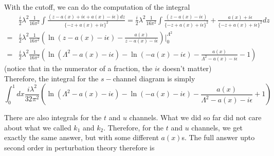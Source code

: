 \documentclass[11pt, notitlepage]{report}
\numberwithin{equation}{section}
\begin{document}
With the cutoff, we can do the computation of the integral 
\begin{align*}
    &\frac{i}{2}\lambda^2  \frac{1}{16\pi^2}\int  \frac{(z -a(x) + i\epsilon +a(x)-i\epsilon) dz}{\{-z + a(x) + i\epsilon\}^2} = \frac{i}{2}\lambda^2  \frac{1}{16\pi^2}\int  \frac{(z -a(x)-i\epsilon)}{\{-z + a(x) + i\epsilon\}^2} + \frac{a(x) +i\epsilon}{\{-z + a(x) + i\epsilon\}^2} dz\\
    =& \frac{i}{2}\lambda^2  \frac{1}{16\pi^2} \left( \ln (z-a(x) -i\epsilon) - \frac{a(x)}{z-a(x) - i\epsilon} \right)\bigg|_0^{\Lambda^2}\\
    =&\frac{i}{2}\lambda^2  \frac{1}{16\pi^2} \left( \ln \left(\Lambda^2-a(x) - i\epsilon \right) - \ln (-a(x) -i\epsilon) - \frac{a(x)}{\Lambda^2-a(x) - i\epsilon} - 1 \right)
\end{align*}
(notice that in the numerator of a fraction, the \(i\epsilon\) doesn't matter)\\

Therefore, the integral for the \(s-\)channel diagram is simply 
\begin{equation*}
    \int_0^1 dx  \frac{i\lambda^2 }{32\pi^2} \left( \ln \left(\Lambda^2-a(x) - i\epsilon \right) - \ln (-a(x) -i\epsilon) - \frac{a(x)}{\Lambda^2-a(x) - i\epsilon} + 1 \right)
\end{equation*}

There are also integrals for the \(t\) and \(u\) channels. What we did so far did not care about what we called \(k_1\) and \(k_2\). Therefore, for the \(t\) and \(u\) channels, we get exactly the same answer, but with some different \(a(x)\)s. The full answer upto second order in perturbation theory therefore is 
\end{document}
